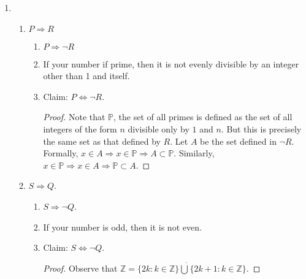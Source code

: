 \documentclass[10pt]{article}
\theoremstyle{plain}
\theoremstyle{definition}
\begin{document}
\maketitle

\begin{enumerate}

\item 

\begin{enumerate}

\item $P \Rightarrow R$

\begin{enumerate}

\item $P \Rightarrow \neg R$

\item If your number if prime, then it is not evenly divisible by an integer other than 1 and itself. 

\item Claim: $P \Leftrightarrow \neg R$. 
\begin{proof}
Note that $\mathbb{P}$, the set of all primes is defined as the set of all integers of the form $n$ divisible only by $1$ and $n$.  But this is precisely the same set as that defined by $R$. Let $A$ be the set defined in $\neg R$.  Formally, $x \in A \Rightarrow x \in \mathbb{P} \Rightarrow A \subset \mathbb{P}$. Similarly, $x \in \mathbb{P} \Rightarrow x \in A \Rightarrow \mathbb{P} \subset A$. 
\end{proof}

\end{enumerate}

\item $S \Rightarrow Q$. 

\begin{enumerate}

\item $S \Rightarrow \neg Q$. 

\item If your number is odd, then it is not even. 

\item Claim: $S \Leftrightarrow \neg Q$. 

\begin{proof} 
Observe that $\mathbb{Z} =\{2k: k \in \mathbb{Z}\} \dot{\bigcup} \{2k + 1: k \in \mathbb{Z} \}. $
\end{proof}

\end{enumerate}




\end{enumerate}
\end{enumerate}
\end{document}
